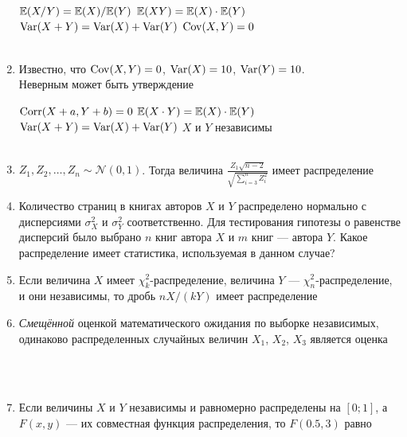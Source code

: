 \documentclass[12pt, a4paper]{article}\usepackage[]{graphicx}\usepackage[]{color}
\newcommand{\cN}{\mathcal{N}}
\begin{document}
\begin{enumerate}
{$\mathbb{E}(X/Y)=\mathbb{E}(X)/\mathbb{E}(Y)$}
{$\mathbb{E}(XY)=\mathbb{E}(X)\cdot\mathbb{E}(Y)$}
{$\operatorname{Var}(X+Y)=\operatorname{Var}(X)+\operatorname{Var}(Y)$}
{$\operatorname{Cov}(X,Y)=0$} \\ \\

\item Известно, что  $\operatorname{Cov}(X,Y)=0$, $\operatorname{Var}(X)=10$, $\operatorname{Var}(Y)=10$. \\
Неверным может быть утверждение

{$\operatorname{Corr}(X+a,Y+b)=0$}
{$\mathbb{E}(X\cdot Y)=\mathbb{E}(X)\cdot \mathbb{E}(Y)$}
{$\operatorname{Var}(X+Y)=\operatorname{Var}(X)+\operatorname{Var}(Y)$}
{$X$ и $Y$ независимы} \\ \\

\item $Z_1,Z_2,\ldots,Z_n\sim\cN(0,1)$. Тогда величина $\frac{Z_1\sqrt{n-2}}{\sqrt{\sum_{i=3}^n Z_i^2}}$ имеет распределение

\otvet {$\cN(0,1)$}{$t_n$}{$F_{1,n-2}$}{$\chi^2_n$}{$t_{n-2}$}

\item Количество страниц в книгах авторов $X$ и $Y$ распределено нормально с дисперсиями $\sigma^2_X$ и $\sigma^2_Y$ соответственно. Для тестирования гипотезы о равенстве дисперсий было выбрано $n$ книг автора $X$ и $m$ книг — автора $Y$. Какое распределение имеет статистика, используемая в данном случае?


\item Если величина $X$ имеет $\chi^2_k$-распределение, величина $Y$ — $\chi^2_n$-распределение, и они независимы, то дробь $nX/(kY)$ имеет распределение


\item \emph{Смещённой} оценкой математического ожидания по выборке независимых,
одинаково распределенных случайных величин $X_1$, $X_2$, $X_3$ является оценка

 \\ \\

\item Если величины $X$ и $Y$ независимы и равномерно распределены на $[0;1]$, а $F(x,y)$ — их совместная функция  распределения, то $F(0.5,3)$ равно


\end{enumerate}
\end{document}
